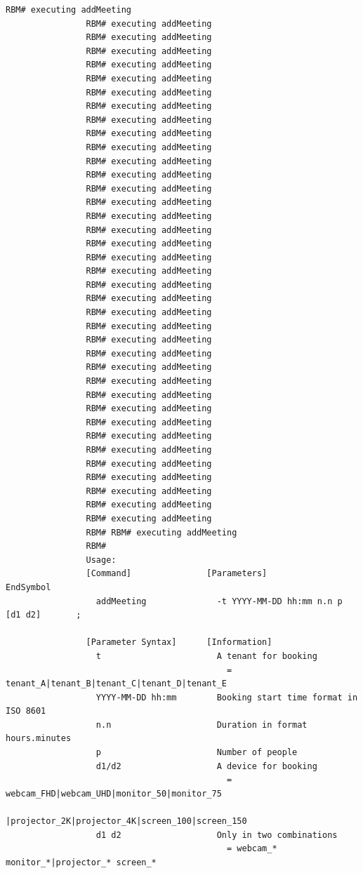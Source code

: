 \documentclass{article}
\begin{document}
\begin{Verbatim}[gobble=8]
                RBM# executing addMeeting
                RBM# executing addMeeting
                RBM# executing addMeeting
                RBM# executing addMeeting
                RBM# executing addMeeting
                RBM# executing addMeeting
                RBM# executing addMeeting
                RBM# executing addMeeting
                RBM# executing addMeeting
                RBM# executing addMeeting
                RBM# executing addMeeting
                RBM# executing addMeeting
                RBM# executing addMeeting
                RBM# executing addMeeting
                RBM# executing addMeeting
                RBM# executing addMeeting
                RBM# executing addMeeting
                RBM# executing addMeeting
                RBM# executing addMeeting
                RBM# executing addMeeting
                RBM# executing addMeeting
                RBM# executing addMeeting
                RBM# executing addMeeting
                RBM# executing addMeeting
                RBM# executing addMeeting
                RBM# executing addMeeting
                RBM# executing addMeeting
                RBM# executing addMeeting
                RBM# executing addMeeting
                RBM# executing addMeeting
                RBM# executing addMeeting
                RBM# executing addMeeting
                RBM# executing addMeeting
                RBM# executing addMeeting
                RBM# executing addMeeting
                RBM# executing addMeeting
                RBM# executing addMeeting
                RBM# executing addMeeting
                RBM# RBM# executing addMeeting
                RBM#
                Usage: 
                [Command]               [Parameters]                            EndSymbol     
                  addMeeting              -t YYYY-MM-DD hh:mm n.n p [d1 d2]       ;           
                
                [Parameter Syntax]      [Information]                                         
                  t                       A tenant for booking                                
                                            = tenant_A|tenant_B|tenant_C|tenant_D|tenant_E    
                  YYYY-MM-DD hh:mm        Booking start time format in ISO 8601               
                  n.n                     Duration in format hours.minutes                    
                  p                       Number of people                                    
                  d1/d2                   A device for booking                                
                                            = webcam_FHD|webcam_UHD|monitor_50|monitor_75     
                                              |projector_2K|projector_4K|screen_100|screen_150
                  d1 d2                   Only in two combinations                            
                                            = webcam_* monitor_*|projector_* screen_*         
                

\end{Verbatim}
\end{document}

